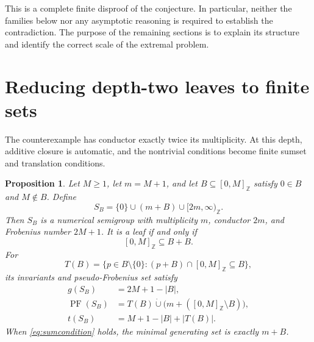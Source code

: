 \documentclass[11pt,letterpaper]{article}
\numberwithin{equation}{section}
\newtheorem{proposition}[theorem]{Proposition}
\theoremstyle{definition}
\theoremstyle{remark}
\newcommand{\Z}{\mathbb Z}
\newcommand{\ints}[2]{[#1,#2]_{\Z}}
\newcommand{\tail}[1]{[#1,\infty)_{\Z}}
\DeclareMathOperator{\PF}{PF}
\begin{document}
This is a complete finite disproof of the conjecture. In particular, neither
the families below nor any asymptotic reasoning is required to establish the
contradiction. The purpose of the remaining sections is to explain its
structure and identify the correct scale of the extremal problem.

\section{Reducing depth-two leaves to finite sets}\label{sec:binary}

The counterexample has conductor exactly twice its multiplicity. At this
depth, additive closure is automatic, and the nontrivial conditions become
finite sumset and translation conditions.

\begin{proposition}\label{prop:binary}
Let $M\ge1$, let $m=M+1$, and let $B\subseteq\ints{0}{M}$ satisfy
$0\in B$ and $M\notin B$. Define
\begin{equation}\label{eq:SB}
 S_B=\{0\}\cup(m+B)\cup\tail{2m}.
\end{equation}
Then $S_B$ is a numerical semigroup with multiplicity $m$, conductor $2m$,
and Frobenius number $2M+1$. It is a leaf if and only if
\begin{equation}\label{eq:sumcondition}
 \ints{0}{M}\subseteq B+B.
\end{equation}
For
\begin{equation}\label{eq:Tdef}
 T(B)=\{p\in B\setminus\{0\}:(p+B)\cap\ints{0}{M}\subseteq B\},
\end{equation}
its invariants and pseudo-Frobenius set satisfy
\begin{align}
 g(S_B)&=2M+1-|B|,\label{eq:binaryg}\\
 \PF(S_B)&=T(B)\mathbin{\dot\cup}
    \bigl(m+(\ints{0}{M}\setminus B)\bigr),\label{eq:binaryPF}\\
 t(S_B)&=M+1-|B|+|T(B)|.\label{eq:binaryt}
\end{align}
When \eqref{eq:sumcondition} holds, the minimal generating set is exactly
$m+B$.
\end{proposition}
\end{document}
